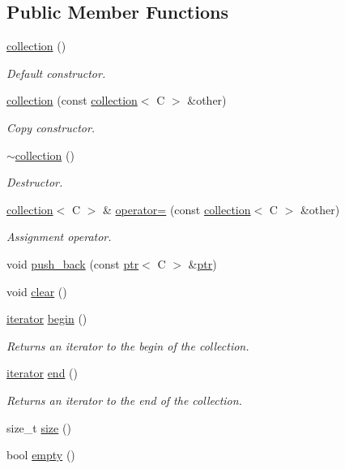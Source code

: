 \subsection*{Public Member Functions}
\begin{DoxyCompactItemize}
\item 
\hyperlink{classdbo_1_1collection_ae50f29fec46adcb871f7aad48dcfea15}{collection} ()
\begin{DoxyCompactList}\small\item\em Default constructor. \end{DoxyCompactList}\item 
\hyperlink{classdbo_1_1collection_a3f4798e657f21b7dabf5f2ad8c408a03}{collection} (const \hyperlink{classdbo_1_1collection}{collection}$<$ C $>$ \&other)
\begin{DoxyCompactList}\small\item\em Copy constructor. \end{DoxyCompactList}\item 
\hyperlink{classdbo_1_1collection_a4cc94ece60b1a87f99c250ef55eef3e4}{$\sim$collection} ()
\begin{DoxyCompactList}\small\item\em Destructor. \end{DoxyCompactList}\item 
\hyperlink{classdbo_1_1collection}{collection}$<$ C $>$ \& \hyperlink{classdbo_1_1collection_a0c43d0bf6e86d59bd0e10f8100e76ee7}{operator=} (const \hyperlink{classdbo_1_1collection}{collection}$<$ C $>$ \&other)
\begin{DoxyCompactList}\small\item\em Assignment operator. \end{DoxyCompactList}\item 
void \hyperlink{classdbo_1_1collection_a207e270b7df92cea700a640a5ac359e5}{push\+\_\+back} (const \hyperlink{classdbo_1_1ptr}{ptr}$<$ C $>$ \&\hyperlink{classdbo_1_1ptr}{ptr})
\item 
void \hyperlink{classdbo_1_1collection_a48e3718fafd427fcf05f6508b3ffe818}{clear} ()
\item 
\hyperlink{classdbo_1_1collection_1_1iterator}{iterator} \hyperlink{classdbo_1_1collection_a963843d0db110b4eeeb5851d957cd545}{begin} ()
\begin{DoxyCompactList}\small\item\em Returns an iterator to the begin of the collection. \end{DoxyCompactList}\item 
\hyperlink{classdbo_1_1collection_1_1iterator}{iterator} \hyperlink{classdbo_1_1collection_a9a0ffa8e99ded7d024a0847597e32f21}{end} ()
\begin{DoxyCompactList}\small\item\em Returns an iterator to the end of the collection. \end{DoxyCompactList}\item 
size\+\_\+t \hyperlink{classdbo_1_1collection_ad0f7875f9a095559335d20583c655a30}{size} ()
\item 
bool \hyperlink{classdbo_1_1collection_aec3e88df5f1f281d7f0366a86e6d9565}{empty} ()
\end{DoxyCompactItemize}
